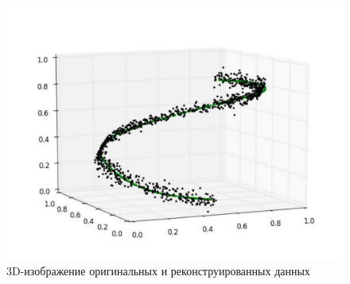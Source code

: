 \begin{figure}[h!]
	\begin{center}
		\includegraphics[width=120mm]{man-source/images/ch3/pic3-7.pdf}
		\caption{3D-изображение оригинальных и реконструированных данных}				
		\label{f:16}
	\end{center}
\end{figure}





